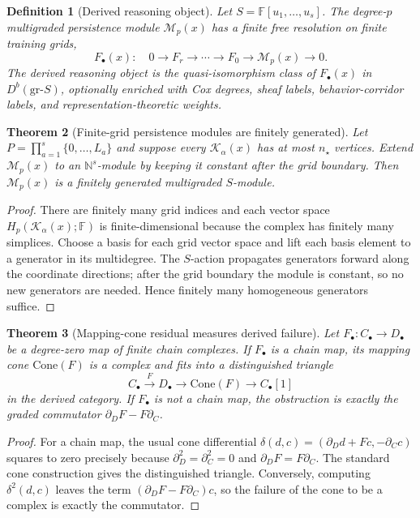 \documentclass[10pt]{article}
\newtheorem{theorem}{Theorem}[section]
\newtheorem{definition}[theorem]{Definition}
\newcommand{\NN}{\mathbb{N}}
\newcommand{\FF}{\mathbb{F}}
\newcommand{\calK}{\mathcal{K}}
\newcommand{\calM}{\mathcal{M}}
\numberwithin{equation}{section}
\begin{document}
\begin{definition}[Derived reasoning object]
Let $S=\FF[u_1,\ldots,u_s]$. The degree-$p$ multigraded persistence module $\calM_p(x)$ has a finite free resolution on finite training grids,
\begin{equation}
F_\bullet(x):\quad 0\to F_r\to\cdots\to F_0\to \calM_p(x)\to 0.
\end{equation}
The derived reasoning object is the quasi-isomorphism class of $F_\bullet(x)$ in $D^b(\mathrm{gr}\text{-}S)$, optionally enriched with Cox degrees, sheaf labels, behavior-corridor labels, and representation-theoretic weights.
\end{definition}

\begin{theorem}[Finite-grid persistence modules are finitely generated]
Let $P=\prod_{a=1}^s\{0,\ldots,L_a\}$ and suppose every $\calK_\alpha(x)$ has at most $n_\star$ vertices. Extend $\calM_p(x)$ to an $\NN^s$-module by keeping it constant after the grid boundary. Then $\calM_p(x)$ is a finitely generated multigraded $S$-module.
\end{theorem}
\begin{proof}
There are finitely many grid indices and each vector space $H_p(\calK_\alpha(x);\FF)$ is finite-dimensional because the complex has finitely many simplices. Choose a basis for each grid vector space and lift each basis element to a generator in its multidegree. The $S$-action propagates generators forward along the coordinate directions; after the grid boundary the module is constant, so no new generators are needed. Hence finitely many homogeneous generators suffice.
\end{proof}

\begin{theorem}[Mapping-cone residual measures derived failure]
Let $F_\bullet:C_\bullet\to D_\bullet$ be a degree-zero map of finite chain complexes. If $F_\bullet$ is a chain map, its mapping cone $\mathrm{Cone}(F)$ is a complex and fits into a distinguished triangle
\begin{equation}
C_\bullet\xrightarrow{F}D_\bullet\to \mathrm{Cone}(F)\to C_\bullet[1]
\end{equation}
in the derived category. If $F_\bullet$ is not a chain map, the obstruction is exactly the graded commutator $\partial_DF-F\partial_C$.
\end{theorem}
\begin{proof}
For a chain map, the usual cone differential $\delta(d,c)=(\partial_Dd+F c,-\partial_C c)$ squares to zero precisely because $\partial_D^2=\partial_C^2=0$ and $\partial_DF=F\partial_C$. The standard cone construction gives the distinguished triangle. Conversely, computing $\delta^2(d,c)$ leaves the term $(\partial_DF-F\partial_C)c$, so the failure of the cone to be a complex is exactly the commutator.
\end{proof}
\end{document}
